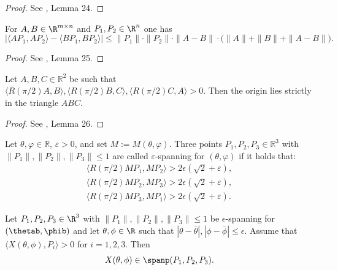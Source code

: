 \begin{proof}
\leanok
See \cite{polyhedron.without.rupert}, Lemma 24.
\end{proof}

\begin{lemma} \label{lem:absscalar}
\leanok
    For $A,B\in \R^{m\times n}$ and $P_1,P_2\in \R^n$ one has
    $$|\langle AP_1,AP_2\rangle-\langle BP_1,BP_2\rangle|\leq \|P_1\|\cdot \|P_2\|\cdot \|A-B\|\cdot \bigg(\|A\|+\|B\| + \|A-B\|\bigg).$$
\end{lemma}

\begin{proof}
\leanok
See \cite{polyhedron.without.rupert}, Lemma 25.
\end{proof}

\begin{lemma} \label{lem:origintriangle}
\leanok
    Let $A,B,C\in \mathbb{R}^2$ be such that $
    \langle R({\pi/2}) A,B\rangle,
    \langle R({\pi/2}) B,C\rangle,
    \langle R({\pi/2}) C,A\rangle >0$. Then the origin lies strictly in the triangle $ABC$.
\end{lemma}

\begin{proof}
\leanok
See \cite{polyhedron.without.rupert}, Lemma 26.
\end{proof}

\begin{definition}
  \label{def:eps-spanning}
  \leanok
  Let $\theta, \varphi \in \mathbb{R}$, $\varepsilon > 0$, and set $M := M(\theta, \varphi)$.
  Three points $P_1, P_2, P_3 \in \mathbb{R}^3$ with $\|P_1\|, \|P_2\|, \|P_3\| \leq 1$ are
  called $\varepsilon$-spanning for $(\theta, \varphi)$ if it holds that:
\begin{align*}
    \langle R(\pi/2) M P_1,M P_{2}\rangle > 2 \epsilon(\sqrt{2} + \varepsilon),\\
    \langle R(\pi/2) M P_2,M P_{3}\rangle > 2 \epsilon(\sqrt{2} + \varepsilon),\\
    \langle R(\pi/2) M P_3,M P_{1}\rangle > 2 \epsilon(\sqrt{2} + \varepsilon).
\end{align*}
\end{definition}


\begin{lemma} \label{lem:eps-spanning}
  \leanok
    Let $P_1, P_2, P_3 \in \R^3$ with $\|P_1\|,\|P_2\|,\|P_3\| \leq 1$ be $\epsilon$-spanning for $(\thetab, \phib)$ and let $\theta, \phi \in \R$ such that $|\theta - \overline{\theta}|, |\phi - \overline{\phi}| \leq \epsilon$. Assume that $\langle X(\theta, \phi), P_i \rangle > 0$ for $i=1,2,3$. Then
    \[
        X(\theta, \phi) \in \spanp(P_1, P_2, P_3).
    \]
\end{lemma}

